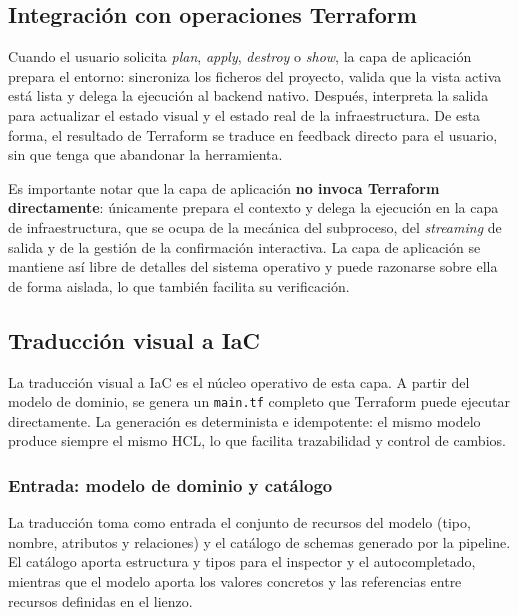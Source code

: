 \documentclass{article}
\begin{document}
{        \subsection{Integración con operaciones Terraform}
        \justify
        Cuando el usuario solicita \textit{plan}, \textit{apply}, \textit{destroy} o
        \textit{show}, la capa de aplicación prepara el entorno: sincroniza los
        ficheros del proyecto, valida que la vista activa está lista y delega la
        ejecución al backend nativo. Después, interpreta la salida para actualizar
        el estado visual y el estado real de la infraestructura. De esta forma, el resultado de Terraform se traduce en feedback
        directo para el usuario, sin que tenga que abandonar la herramienta.

        \justify
        Es importante notar que la capa de aplicación \textbf{no invoca
        Terraform directamente}: únicamente prepara el contexto y delega la
        ejecución en la capa de infraestructura, que se ocupa de la mecánica
        del subproceso, del \textit{streaming} de salida y de la gestión de la
        confirmación interactiva. La capa de aplicación se mantiene así libre
        de detalles del sistema operativo y puede razonarse sobre ella de forma
        aislada, lo que también facilita su verificación.

        \subsection{Traducción visual a IaC}
        \label{sec:traduccion_iac}
        \justify
        La traducción visual a IaC es el núcleo operativo de esta capa. A
        partir del modelo de dominio, se genera un \texttt{main.tf} completo
        que Terraform puede ejecutar directamente. La generación es
        determinista e idempotente: el mismo modelo produce siempre el mismo
        HCL, lo que facilita trazabilidad y control de cambios.

        \subsubsection*{Entrada: modelo de dominio y catálogo}
        \justify
        La traducción toma como entrada el conjunto de recursos del modelo
        (tipo, nombre, atributos y relaciones) y el catálogo de schemas
        generado por la pipeline. El catálogo aporta estructura y tipos para el
        inspector y el autocompletado, mientras que el modelo aporta los
        valores concretos y las referencias entre recursos definidas en el
        lienzo.

}
\end{document}
